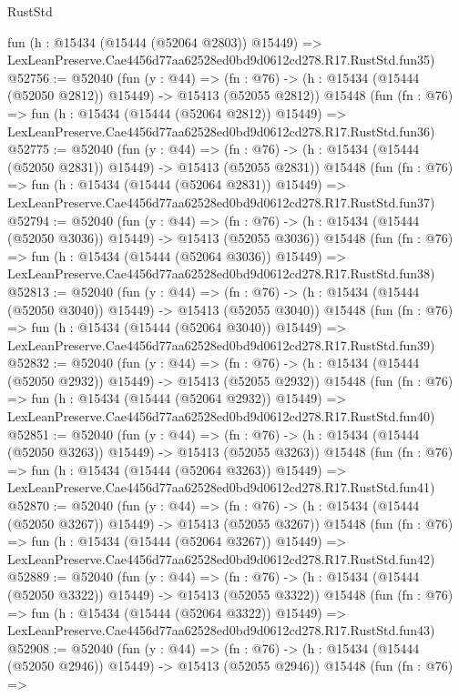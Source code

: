 \begin{lexlean}{RustStd}
\begin{coremodule}
    fun (h : @15434 (@15444 (@52064 @2803)) @15449) =>
    LexLeanPreserve.Cae4456d77aa62528ed0bd9d0612cd278.R17.RustStd.fun35)
@52756 := @52040
    (fun (y : @44) =>
    (fn : @76) -> (h : @15434 (@15444 (@52050 @2812)) @15449) -> @15413 (@52055 @2812))
    @15448
    (fun (fn : @76) =>
    fun (h : @15434 (@15444 (@52064 @2812)) @15449) =>
    LexLeanPreserve.Cae4456d77aa62528ed0bd9d0612cd278.R17.RustStd.fun36)
@52775 := @52040
    (fun (y : @44) =>
    (fn : @76) -> (h : @15434 (@15444 (@52050 @2831)) @15449) -> @15413 (@52055 @2831))
    @15448
    (fun (fn : @76) =>
    fun (h : @15434 (@15444 (@52064 @2831)) @15449) =>
    LexLeanPreserve.Cae4456d77aa62528ed0bd9d0612cd278.R17.RustStd.fun37)
@52794 := @52040
    (fun (y : @44) =>
    (fn : @76) -> (h : @15434 (@15444 (@52050 @3036)) @15449) -> @15413 (@52055 @3036))
    @15448
    (fun (fn : @76) =>
    fun (h : @15434 (@15444 (@52064 @3036)) @15449) =>
    LexLeanPreserve.Cae4456d77aa62528ed0bd9d0612cd278.R17.RustStd.fun38)
@52813 := @52040
    (fun (y : @44) =>
    (fn : @76) -> (h : @15434 (@15444 (@52050 @3040)) @15449) -> @15413 (@52055 @3040))
    @15448
    (fun (fn : @76) =>
    fun (h : @15434 (@15444 (@52064 @3040)) @15449) =>
    LexLeanPreserve.Cae4456d77aa62528ed0bd9d0612cd278.R17.RustStd.fun39)
@52832 := @52040
    (fun (y : @44) =>
    (fn : @76) -> (h : @15434 (@15444 (@52050 @2932)) @15449) -> @15413 (@52055 @2932))
    @15448
    (fun (fn : @76) =>
    fun (h : @15434 (@15444 (@52064 @2932)) @15449) =>
    LexLeanPreserve.Cae4456d77aa62528ed0bd9d0612cd278.R17.RustStd.fun40)
@52851 := @52040
    (fun (y : @44) =>
    (fn : @76) -> (h : @15434 (@15444 (@52050 @3263)) @15449) -> @15413 (@52055 @3263))
    @15448
    (fun (fn : @76) =>
    fun (h : @15434 (@15444 (@52064 @3263)) @15449) =>
    LexLeanPreserve.Cae4456d77aa62528ed0bd9d0612cd278.R17.RustStd.fun41)
@52870 := @52040
    (fun (y : @44) =>
    (fn : @76) -> (h : @15434 (@15444 (@52050 @3267)) @15449) -> @15413 (@52055 @3267))
    @15448
    (fun (fn : @76) =>
    fun (h : @15434 (@15444 (@52064 @3267)) @15449) =>
    LexLeanPreserve.Cae4456d77aa62528ed0bd9d0612cd278.R17.RustStd.fun42)
@52889 := @52040
    (fun (y : @44) =>
    (fn : @76) -> (h : @15434 (@15444 (@52050 @3322)) @15449) -> @15413 (@52055 @3322))
    @15448
    (fun (fn : @76) =>
    fun (h : @15434 (@15444 (@52064 @3322)) @15449) =>
    LexLeanPreserve.Cae4456d77aa62528ed0bd9d0612cd278.R17.RustStd.fun43)
@52908 := @52040
    (fun (y : @44) =>
    (fn : @76) -> (h : @15434 (@15444 (@52050 @2946)) @15449) -> @15413 (@52055 @2946))
    @15448
    (fun (fn : @76) =>

\end{coremodule}
\end{lexlean}

